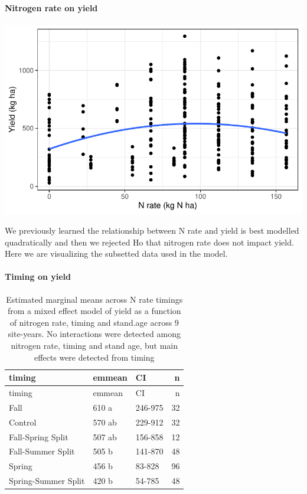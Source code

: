 \documentclass[
  letterpaper,
  DIV=11,
  numbers=noendperiod]{scrartcl}
\let\oldparagraph\paragraph
\renewcommand{\paragraph}[1]{\oldparagraph{#1}\mbox{}}
\begin{document}
\hypertarget{nitrogen-rate-on-yield}{%
\paragraph{Nitrogen rate on yield}\label{nitrogen-rate-on-yield}}

\includegraphics{nrate_draft_files/figure-pdf/nrate effect-1.pdf}

We previously learned the relationship between N rate and yield is best
modelled quadratically and then we rejected Ho that nitrogen rate does
not impact yield. Here we are visualizing the subsetted data used in the
model.

\hypertarget{timing-on-yield}{%
\paragraph{Timing on yield}\label{timing-on-yield}}

\begin{longtable}[]{@{}lllr@{}}
\caption{Estimated marginal means across N rate timings from a mixed
effect model of yield as a function of nitrogen rate, timing and
stand.age across 9 site-years. No interactions were detected among
nitrogen rate, timing and stand age, but main effects were detected from
timing}\tabularnewline
\toprule()
timing & emmean & CI & n \\
\midrule()
\endfirsthead
\toprule()
timing & emmean & CI & n \\
\midrule()
\endhead
Fall & 610 a & 246-975 & 32 \\
Control & 570 ab & 229-912 & 32 \\
Fall-Spring Split & 507 ab & 156-858 & 12 \\
Fall-Summer Split & 505 b & 141-870 & 48 \\
Spring & 456 b & 83-828 & 96 \\
Spring-Summer Split & 420 b & 54-785 & 48 \\
\bottomrule()
\end{longtable}
\end{document}
